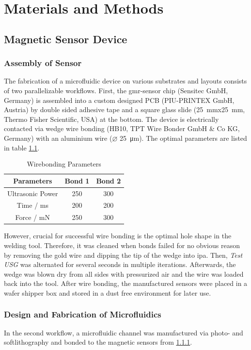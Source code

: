 \chapter{Materials and Methods}

\section{Magnetic Sensor Device} 

\subsection{Assembly of Sensor}
\label{sec:meth:sensor}
The fabrication of a microfluidic device on various substrates and layouts consists of two parallelizable workflows. First, the \gls{gmr}-sensor chip (Sensitec GmbH, Germany) is assembled into a custom designed PCB (PIU-PRINTEX GmbH, Austria) by double sided adhesive tape and a square glass slide (\SI{25}{\milli\meter}x\SI{25}{\milli\meter}, Thermo Fisher Scientific, USA) at the bottom. The device is electrically contacted via wedge wire bonding (HB10, TPT Wire Bonder GmbH \& Co KG, Germany) with an aluminium wire ($\varnothing$ \SI{25}{\micro\meter}). The optimal parameters are listed in table \ref{tab:params_wirebonding}. 
\begin{table}[htb]
	\centering
\begin{tabularx}{.5\linewidth}{ccc}
	\toprule[1pt]
	Parameters & Bond 1 & Bond 2 \\
	\midrule
	Ultrasonic Power & 250 & 300 \\
	Time / ms & 200 & 200 \\
	Force / mN & 250 & 300 \\
	\bottomrule[1.2pt]
\end{tabularx}
\caption{Wirebonding Parameters}
\label{tab:params_wirebonding}
\end{table}
However, crucial for successful wire bonding is the optimal hole shape in the welding tool. Therefore, it was cleaned when bonds failed for no obvious reason by removing the gold wire and dipping the tip of the wedge into \gls{ipa}. Then, \textit{Test USG} was alternated for several seconds in multiple iterations. Afterwards, the wedge was blown dry from all sides with pressurized air and the wire was loaded back into the tool.
After wire bonding, the manufactured sensors were placed in a wafer shipper box and stored in a dust free environment for later use.
\subsection{Design and Fabrication of Microfluidics}
In the second workflow, a microfluidic channel was manufactured via photo- and softlithography and bonded to the magnetic sensors from \ref{sec:meth:sensor}.
